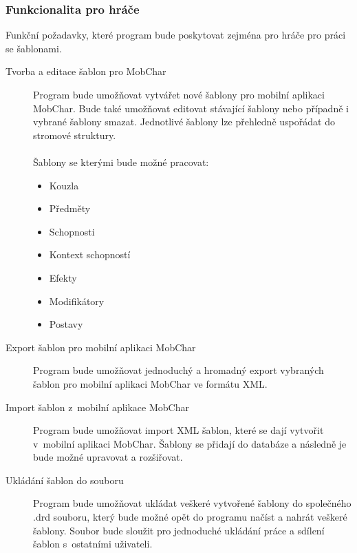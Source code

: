 \documentclass[thesis=B,czech]{resources/FITthesis}[2012/06/26]
\begin{document}
\subsubsection{Funkcionalita pro hráče}
Funkční požadavky, které program bude poskytovat zejména pro hráče pro práci se šablonami.
\begin{description}

\item[Tvorba a editace šablon pro MobChar] Program bude umožňovat vytvářet nové šablony pro mobilní aplikaci MobChar. Bude také umožňovat editovat stávající šablony nebo případně i vybrané šablony smazat. Jednotlivé šablony lze přehledně uspořádat do stromové struktury.\\
\\
Šablony se kterými bude možné pracovat:
				\begin{itemize}
					\item Kouzla
					\item Předměty
					\item Schopnosti
					\item Kontext schopností
					\item Efekty
					\item Modifikátory
					\item Postavy
				\end{itemize}		
\item[Export šablon pro mobilní aplikaci MobChar] Program bude umožňovat jednoduchý a hromadný export vybraných šablon pro mobilní aplikaci MobChar ve formátu XML.

\item[Import šablon z~mobilní aplikace MobChar] Program bude umožňovat import XML šablon, které se dají vytvořit v~mobilní aplikaci MobChar. Šablony se přidají do databáze a následně je bude možné upravovat a rozšiřovat.

\item[Ukládání šablon do souboru] Program bude umožňovat ukládat veškeré vytvořené šablony do společného .drd souboru, který bude možné opět do programu načíst a nahrát veškeré šablony. Soubor bude sloužit pro jednoduché ukládání práce a sdílení šablon s~ostatními uživateli. 
\end{description}
\end{document}

